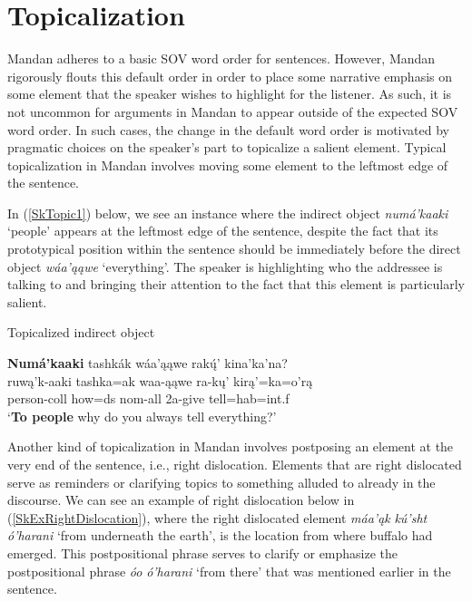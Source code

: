 \section{Topicalization}\label{CHSk7}

Mandan adheres to a basic SOV word order for sentences. However, Mandan rigorously flouts this default order in order to place some narrative emphasis on some element that the speaker wishes to highlight for the listener. As such, it is not uncommon for arguments in Mandan to appear outside of the expected SOV word order. In such cases, the change in the default word order is motivated by pragmatic choices on the speaker's part to topicalize a salient element. Typical topicalization in Mandan involves moving some element to the leftmost edge of the sentence. 

In (\ref{SkTopic1}) below, we see an instance where the indirect object \textit{numá'kaaki} `people' appears at the leftmost edge of the sentence, despite the fact that its prototypical position within the sentence should be immediately before the direct object \textit{wáa'ąąwe} `everything'. The speaker is highlighting who the addressee is talking to and bringing their attention to the fact that this element is particularly salient.

\begin{exe}

    \item\label{SkTopic1} Topicalized indirect object
    
    \glll \textbf{Numá'kaaki} tashkák wáa'ąąwe rakų́' kina'ka'na?\\
    ruwą'k-aaki tashka=ak waa-ąąwe ra-kų' kirą'=ka=o'rą\\
    \textnormal{person}-coll \textnormal{how}=ds nom-\textnormal{all} 2a-\textnormal{give} \textnormal{tell}=hab=int.f\\
    \glt `\textbf{To people} why do you always tell everything?' \citep[213]{hollow1973a}
\end{exe}

Another kind of topicalization in Mandan involves postposing an element at the very end of the sentence, i.e., right dislocation. Elements that are right dislocated serve as reminders or clarifying topics to something alluded to already in the discourse. We can see an example of right dislocation below in (\ref{SkExRightDislocation}), where the right dislocated element \textit{máa'ąk} \textit{kú'sht} \textit{ó'harani} `from underneath the earth', is the location from where buffalo had emerged. This postpositional phrase serves to clarify or emphasize the postpositional phrase \textit{óo} \textit{ó'harani} `from there' that was mentioned earlier in the sentence.

